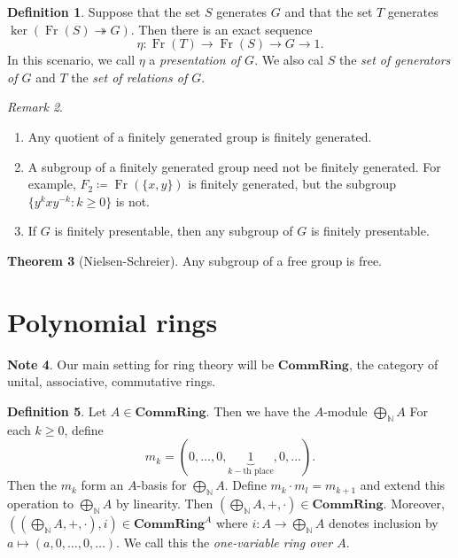 \documentclass[10pt,letterpaper,cm]{nupset}
\theoremstyle{definition}
\newtheorem{definition}{Definition}[subsection]
\newtheorem{note}[definition]{Note}
\theoremstyle{theorem}
\newtheorem{theorem}[definition]{Theorem}
\theoremstyle{remark}
\newtheorem{remark}[definition]{Remark}
\newcommand{\N}{\mathbb N}
\newcommand{\1}{\mathbf{1}}
\newcommand{\0}{\vec 0}
\DeclareMathOperator{\Fr}{Fr}
\begin{document}
\begin{definition}
Suppose that the set $S$ generates $G$ and that the set $T$ generates $\ker(\Fr(S) \twoheadrightarrow G)$. Then there is an exact sequence $$\eta :  \Fr(T) \to \Fr(S) \to G \to 1.$$ In this scenario, we call $\eta$ a \textit{presentation of $G$}. We also cal $S$ the \textit{set of generators of $G$} and $T$ the \textit{set of relations of $G$}.
\end{definition}

\begin{remark} $ $
\begin{enumerate}
\item Any quotient of a finitely generated group is finitely generated.
\item A subgroup of a finitely generated group need not be finitely generated. For example, $F_2\coloneqq \Fr(\{x,y\})$ is finitely generated, but the subgroup $\{y^kxy^{-k} : k \geq 0\}$ is not.
\item If $G$ is finitely presentable, then any subgroup of $G$ is finitely presentable.
\end{enumerate}  
\end{remark}

\begin{theorem}[Nielsen-Schreier]
Any subgroup of a free group is free.
\end{theorem}

\section{Polynomial rings}

\begin{note}
Our main setting for ring theory will be $\mathbf{CommRing}$, the category of unital, associative, commutative rings.
\end{note}

\begin{definition}
Let $A \in \mathbf{CommRing}$. Then we have the $A$-module $\bigoplus_{\N} A$ For each $k\geq 0$, define $$m_k = (0, \ldots, 0, \underbrace{1}_{k-\text{th place}}, 0 , \ldots).$$ Then the $m_k$ form an $A$-basis for  $\bigoplus_{\N} A$. Define $m_k \cdot m_l = m_{k+1}$ and extend this operation to $\bigoplus_{\N} A$ by linearity. Then $(\bigoplus_{\N} A, + , \cdot) \in  \mathbf{CommRing}$. Moreover, $((\bigoplus_{\N} A, + , \cdot), i) \in  \mathbf{CommRing}^A$ where $i : A \to \bigoplus_{\N}A$ denotes inclusion by $a \mapsto (a, 0, \ldots, 0, \ldots)$. We call this the \textit{one-variable ring over $A$}.
\end{definition}
\end{document}
